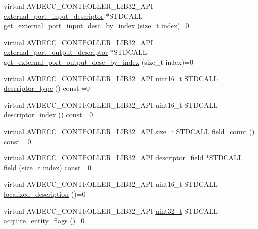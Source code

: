 \begin{DoxyCompactItemize}
\item 
virtual A\+V\+D\+E\+C\+C\+\_\+\+C\+O\+N\+T\+R\+O\+L\+L\+E\+R\+\_\+\+L\+I\+B32\+\_\+\+A\+PI \hyperlink{classavdecc__lib_1_1external__port__input__descriptor}{external\+\_\+port\+\_\+input\+\_\+descriptor} $\ast$S\+T\+D\+C\+A\+LL \hyperlink{classavdecc__lib_1_1configuration__descriptor_a0ce53511b68efa1e6e992431faac667e}{get\+\_\+external\+\_\+port\+\_\+input\+\_\+desc\+\_\+by\+\_\+index} (size\+\_\+t index)=0
\item 
virtual A\+V\+D\+E\+C\+C\+\_\+\+C\+O\+N\+T\+R\+O\+L\+L\+E\+R\+\_\+\+L\+I\+B32\+\_\+\+A\+PI \hyperlink{classavdecc__lib_1_1external__port__output__descriptor}{external\+\_\+port\+\_\+output\+\_\+descriptor} $\ast$S\+T\+D\+C\+A\+LL \hyperlink{classavdecc__lib_1_1configuration__descriptor_a58f09b090b126e803061158bf1e22c5e}{get\+\_\+external\+\_\+port\+\_\+output\+\_\+desc\+\_\+by\+\_\+index} (size\+\_\+t index)=0
\item 
virtual A\+V\+D\+E\+C\+C\+\_\+\+C\+O\+N\+T\+R\+O\+L\+L\+E\+R\+\_\+\+L\+I\+B32\+\_\+\+A\+PI uint16\+\_\+t S\+T\+D\+C\+A\+LL \hyperlink{classavdecc__lib_1_1descriptor__base_a5112b70022171063ec5d3242bee9910e}{descriptor\+\_\+type} () const =0
\item 
virtual A\+V\+D\+E\+C\+C\+\_\+\+C\+O\+N\+T\+R\+O\+L\+L\+E\+R\+\_\+\+L\+I\+B32\+\_\+\+A\+PI uint16\+\_\+t S\+T\+D\+C\+A\+LL \hyperlink{classavdecc__lib_1_1descriptor__base_a7eed5583bffdf72d89021b188648c1b5}{descriptor\+\_\+index} () const =0
\item 
virtual A\+V\+D\+E\+C\+C\+\_\+\+C\+O\+N\+T\+R\+O\+L\+L\+E\+R\+\_\+\+L\+I\+B32\+\_\+\+A\+PI size\+\_\+t S\+T\+D\+C\+A\+LL \hyperlink{classavdecc__lib_1_1descriptor__base_ab1edf4996377ed957088a7b3b16aca7d}{field\+\_\+count} () const =0
\item 
virtual A\+V\+D\+E\+C\+C\+\_\+\+C\+O\+N\+T\+R\+O\+L\+L\+E\+R\+\_\+\+L\+I\+B32\+\_\+\+A\+PI \hyperlink{classavdecc__lib_1_1descriptor__field}{descriptor\+\_\+field} $\ast$S\+T\+D\+C\+A\+LL \hyperlink{classavdecc__lib_1_1descriptor__base_aa3716832eed0b6f6dcfba358c5d2c601}{field} (size\+\_\+t index) const =0
\item 
virtual A\+V\+D\+E\+C\+C\+\_\+\+C\+O\+N\+T\+R\+O\+L\+L\+E\+R\+\_\+\+L\+I\+B32\+\_\+\+A\+PI uint16\+\_\+t S\+T\+D\+C\+A\+LL \hyperlink{classavdecc__lib_1_1descriptor__base_a1fb9de45567df344090a1407aa6b775f}{localized\+\_\+description} ()=0
\item 
virtual A\+V\+D\+E\+C\+C\+\_\+\+C\+O\+N\+T\+R\+O\+L\+L\+E\+R\+\_\+\+L\+I\+B32\+\_\+\+A\+PI \hyperlink{parse_8c_a6eb1e68cc391dd753bc8ce896dbb8315}{uint32\+\_\+t} S\+T\+D\+C\+A\+LL \hyperlink{classavdecc__lib_1_1descriptor__base_a42f2a796375edd05c8d29856c018042d}{acquire\+\_\+entity\+\_\+flags} ()=0

\end{DoxyCompactItemize}
